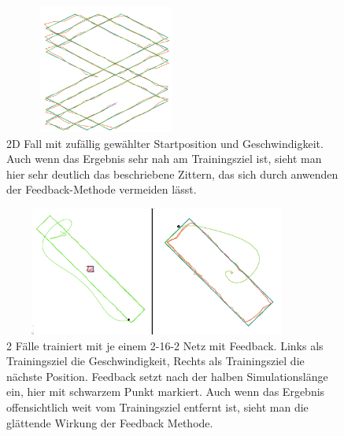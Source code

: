 \begin{figure}
	\centering
	\includegraphics[width=0.6\textwidth, height=160px]{pics/fb.png}	
	\caption{2D Fall mit zufällig gewählter Startposition und Geschwindigkeit. Auch wenn das Ergebnis sehr nah am Trainingsziel ist, sieht man hier sehr deutlich das beschriebene Zittern, das sich durch anwenden der Feedback-Methode vermeiden lässt.}
	\label{img:fb}
\end{figure}
\begin{figure}
	\centering
	\includegraphics[width=0.9\textwidth, height=160px]{pics/fb2.png}	
	\caption{2 Fälle trainiert mit je einem 2-16-2 Netz mit Feedback. Links als Trainingsziel die Geschwindigkeit, Rechts als Trainingsziel die nächste Position. Feedback setzt nach der halben Simulationslänge ein, hier mit schwarzem Punkt markiert. Auch wenn das Ergebnis offensichtlich weit vom Trainingsziel entfernt ist, sieht man die glättende Wirkung der Feedback Methode.}
	\label{img:fb2}
\end{figure}



